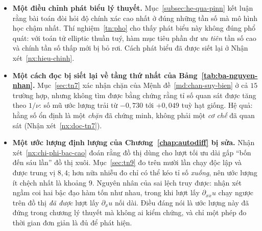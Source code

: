 \begin{itemize}[leftmargin=*]
\item \textbf{Một điều chỉnh phát biểu lý thuyết.} Mục~\ref{subsec:he-qua-pinn}
      kết luận rằng bài toán đòi hỏi độ chính xác cao nhất ở đúng những tần số mà
      mô hình học chậm nhất. Thí nghiệm~\ref{tn:pho} cho thấy phát biểu này
      không đúng phổ quát: với toán tử elliptic thuần tuý, hàm mục tiêu phần dư
      \emph{ưu tiên} tần số cao và chính tần số thấp mới bị bỏ rơi. Cách phát
      biểu đã được siết lại ở Nhận xét~\ref{nx:hieu-chinh}.
\item \textbf{Một cách đọc bị siết lại về tầng thứ nhất của
      Bảng~\ref{tab:ba-nguyen-nhan}.} Mục~\ref{sec:tn7} xác nhận chặn của
      Mệnh đề~\ref{md:chan-suy-bien} ở cả $15$ trường hợp, nhưng không tìm được
      bằng chứng rằng tỉ số quan sát được tăng theo $1/\nu$: số mũ ước lượng
      trải từ $-0{,}730$ tới $+0{,}049$ tuỳ hạt giống. Hệ quả:
      hằng số ổn định là một \emph{chặn} đã chứng minh, không phải một
      \emph{cơ chế} đã quan sát (Nhận xét~\ref{nx:doc-tn7}).
\item \textbf{Một ước lượng định lượng của Chương~\ref{chap:autodiff} bị sửa.}
      Nhận xét~\ref{nx:chi-phi-bac-cao} đoán rằng đồ thị dùng cho lượt tối ưu
      dài gấp ``bốn đến sáu lần'' đồ thị xuôi. Mục~\ref{sec:tn9} đo trên mười
      lần chạy độc lập và được trung vị $8{,}4$; hơn nữa nhiễu đo chỉ có thể kéo
      tỉ số \emph{xuống}, nên ước lượng ít chệch nhất là khoảng $9$. Nguyên nhân
      của sai lệch truy được: nhận xét ngầm coi hai bậc đạo hàm tốn như nhau,
      trong khi lượt lấy $\partial_{xx}u$ chạy ngược trên đồ thị \emph{đã được}
      lượt lấy $\partial_{x}u$ nối dài. Điều đáng nói là ước lượng này đã đứng
      trong chương lý thuyết mà không ai kiểm chứng, và chỉ một phép đo thời
      gian đơn giản là đủ để phát hiện.


\end{itemize}
